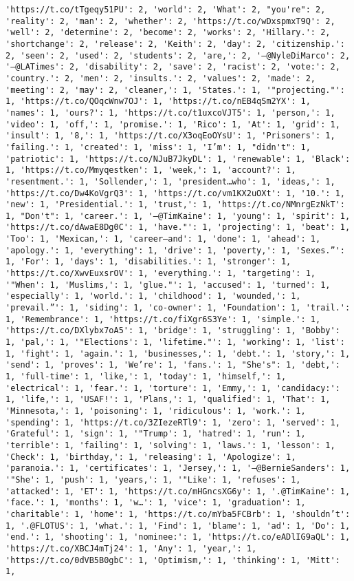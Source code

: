 \documentclass[11pt]{article}
\begin{document}
\begin{Verbatim}[commandchars=\\\{\}]
'https://t.co/tTgeqy51PU': 2, 'world': 2, 'What': 2, "you're": 2, 'reality': 2, 'man': 2, 'whether': 2, 'https://t.co/wDxspmxT9Q': 2, 'well': 2, 'determine': 2, 'become': 2, 'works': 2, 'Hillary.': 2, 'shortchange': 2, 'release': 2, 'Keith': 2, 'day': 2, 'citizenship.': 2, 'seen': 2, 'used': 2, 'students': 2, 'are,': 2, '—@NyleDiMarco': 2, '—@LATimes': 2, 'disability': 2, 'save': 2, 'racist': 2, 'vote:': 2, 'country.': 2, 'men': 2, 'insults.': 2, 'values': 2, 'made': 2, 'meeting': 2, 'may': 2, 'cleaner,': 1, 'States.': 1, '"projecting."': 1, 'https://t.co/QOqcWnw7OJ': 1, 'https://t.co/nEB4qSm2YX': 1, 'names': 1, 'ours?': 1, 'https://t.co/t1uxcoVJT5': 1, 'person,': 1, 'video': 1, 'off,': 1, 'promise.': 1, 'Rico': 1, 'At': 1, 'grid': 1, 'insult': 1, '8,': 1, 'https://t.co/X3oqEoOYsU': 1, 'Prisoners': 1, 'failing.': 1, 'created': 1, 'miss': 1, 'I’m': 1, "didn't": 1, 'patriotic': 1, 'https://t.co/NJuB7JkyDL': 1, 'renewable': 1, 'Black': 1, 'https://t.co/Mmyqestken': 1, 'week,': 1, 'account?': 1, 'resentment.': 1, 'Sollender,': 1, 'president…who': 1, 'ideas,': 1, 'https://t.co/Dw4KoVgrQ3': 1, 'https://t.co/vm1KX2uOXt': 1, '10.': 1, 'new': 1, 'Presidential.': 1, 'trust,': 1, 'https://t.co/NMnrgEzNkT': 1, "Don't": 1, 'career.': 1, '—@TimKaine': 1, 'young': 1, 'spirit': 1, 'https://t.co/dAwaE8Dg0C': 1, 'have."': 1, 'projecting': 1, 'beat': 1, 'Too': 1, 'Mexican,': 1, 'career—and': 1, 'done': 1, 'ahead': 1, 'apology.': 1, 'everything': 1, 'drive': 1, 'poverty,': 1, 'Sexes.”': 1, 'For': 1, 'days': 1, 'disabilities.': 1, 'stronger': 1, 'https://t.co/XwvEuxsrOV': 1, 'everything.': 1, 'targeting': 1, '"When': 1, 'Muslims,': 1, 'glue."': 1, 'accused': 1, 'turned': 1, 'especially': 1, 'world.': 1, 'childhood': 1, 'wounded,': 1, 'prevail.”': 1, 'siding': 1, 'co-owner': 1, 'Foundation': 1, 'trail.': 1, 'Remembrance': 1, 'https://t.co/fiXgr6S3Ye': 1, 'simple.': 1, 'https://t.co/DXlybx7oA5': 1, 'bridge': 1, 'struggling': 1, 'Bobby': 1, 'pal,': 1, '"Elections': 1, 'lifetime."': 1, 'working': 1, 'list': 1, 'fight': 1, 'again.': 1, 'businesses,': 1, 'debt.': 1, 'story,': 1, 'send': 1, 'proves': 1, 'We’re': 1, 'fans.': 1, "She's": 1, 'debt,': 1, 'full-time': 1, 'like,': 1, 'today': 1, 'himself,': 1, 'electrical': 1, 'fear.': 1, 'torture': 1, 'Emmy,': 1, 'candidacy:': 1, 'life,': 1, 'USAF!': 1, 'Plans,': 1, 'qualified': 1, 'That': 1, 'Minnesota,': 1, 'poisoning': 1, 'ridiculous': 1, 'work.': 1, 'spending': 1, 'https://t.co/3ZIezeRTl9': 1, 'zero': 1, 'served': 1, 'Grateful': 1, 'sign': 1, '"Trump': 1, 'hatred': 1, 'run': 1, 'terrible': 1, 'failing': 1, 'solving': 1, 'laws.': 1, 'lesson': 1, 'Check': 1, 'birthday,': 1, 'releasing': 1, 'Apologize': 1, 'paranoia.': 1, 'certificates': 1, 'Jersey,': 1, '—@BernieSanders': 1, '"She': 1, 'push': 1, 'years,': 1, '"Like': 1, 'refuses': 1, 'attacked': 1, 'ET': 1, 'https://t.co/mHGncsXG6y': 1, '.@TimKaine': 1, 'face.': 1, 'months': 1, 'w…': 1, 'vice': 1, 'graduation': 1, 'charitable': 1, 'home': 1, 'https://t.co/mYba5FCBrb': 1, 'shouldn’t': 1, '.@FLOTUS': 1, 'what.': 1, 'Find': 1, 'blame': 1, 'ad': 1, 'Do': 1, 'end.': 1, 'shooting': 1, 'nominee:': 1, 'https://t.co/eADlIG9aQL': 1, 'https://t.co/XBCJ4mTj24': 1, 'Any': 1, 'year,': 1, 'https://t.co/0dVB5B0gbC': 1, 'Optimism,': 1, 'thinking': 1, 'Mitt': 1, 
\end{Verbatim}
\end{document}
